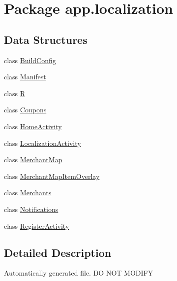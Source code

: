 \hypertarget{namespaceapp_1_1localization}{\section{Package app.\-localization}
\label{namespaceapp_1_1localization}
}
\subsection*{Data Structures}
\begin{DoxyCompactItemize}
\item 
class \hyperlink{classapp_1_1localization_1_1_build_config}{Build\-Config}
\item 
class \hyperlink{classapp_1_1localization_1_1_manifest}{Manifest}
\item 
class \hyperlink{classapp_1_1localization_1_1_r}{R}
\item 
class \hyperlink{classapp_1_1localization_1_1_coupons}{Coupons}
\item 
class \hyperlink{classapp_1_1localization_1_1_home_activity}{Home\-Activity}
\item 
class \hyperlink{classapp_1_1localization_1_1_localization_activity}{Localization\-Activity}
\item 
class \hyperlink{classapp_1_1localization_1_1_merchant_map}{Merchant\-Map}
\item 
class \hyperlink{classapp_1_1localization_1_1_merchant_map_item_overlay}{Merchant\-Map\-Item\-Overlay}
\item 
class \hyperlink{classapp_1_1localization_1_1_merchants}{Merchants}
\item 
class \hyperlink{classapp_1_1localization_1_1_notifications}{Notifications}
\item 
class \hyperlink{classapp_1_1localization_1_1_register_activity}{Register\-Activity}
\end{DoxyCompactItemize}


\subsection{Detailed Description}
Automatically generated file. D\-O N\-O\-T M\-O\-D\-I\-F\-Y 